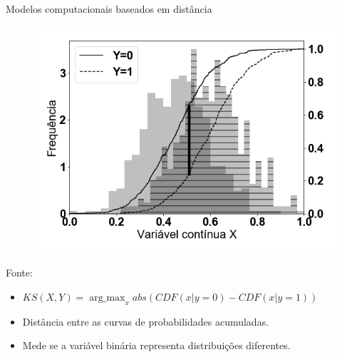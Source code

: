 \begin{frame}{Modelos computacionais baseados em distância}
	\begin{tcolorbox}[colback=blue!5!white,colframe=blue!75!black,title=Distância Komogorov-Smirnov,height=5cm,valign=center]\selectFont
		\selectFont
		\begin{center}
			\begin{figure}[]
				\includegraphics[scale=0.20]{images/KS_teorico.png}
				\label{fig:ksTeorico}
			\end{figure}
			Fonte: \SourcePadrao
		\end{center}
	\end{tcolorbox}


	\begin{tcolorbox}[colback=blue!5!white,colframe=blue!75!black,title=Definição e propriedades,valign=center]\selectFont
	\begin{itemize}
		\item $KS(X,Y) = \operatorname*{arg\_max}_x abs(CDF(x | y=0)- CDF(x | y=1))$
		\item Distância entre as curvas de probabilidades acumuladas.
		\item Mede se a variável binária representa distribuições diferentes.
	\end{itemize}
	\end{tcolorbox}
\end{frame}

